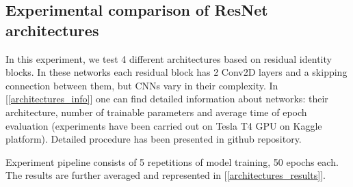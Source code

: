 \documentclass{article}
\begin{document}
\subsection{Experimental comparison of ResNet architectures}

In this experiment, we test 4 different architectures based on residual identity blocks. 
In these networks each residual block has 2 Conv2D layers and a skipping connection between them, but CNNs vary in their complexity. In [\ref{architectures_info}] one can find detailed information about networks: their architecture, number of trainable parameters and average time of epoch evaluation (experiments have been carried out on Tesla T4 GPU on Kaggle platform). Detailed procedure has been presented in github repository.

Experiment pipeline consists of 5 repetitions of model training, 50 epochs each. The results are further averaged and represented in [\ref{architectures_results}].
\end{document}
